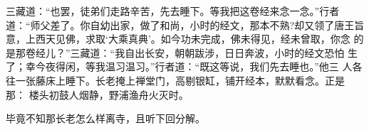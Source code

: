 三藏道：“也罢，徒弟们走路辛苦，先去睡下。等我把这卷经来念一念。”行者
道：“师父差了。你自幼出家，做了和尚，小时的经文，那本不熟?却又领了唐王旨
意，上西天见佛，求取‘大乘真典’。如今功未完成，佛未得见，经未曾取，你念
的是那卷经儿？”三藏道：“我自出长安，朝朝跋涉，日日奔波，小时的经文恐怕
生了；幸今夜得闲，等我温习温习。”行者道：“既这等说，我们先去睡也。”他三
人各往一张藤床上睡下。长老掩上禅堂门，高剔银缸，铺开经本，默默看念。正是
那：
楼头初鼓人烟静，野浦渔舟火灭时。

毕竟不知那长老怎么样离寺，且听下回分解。